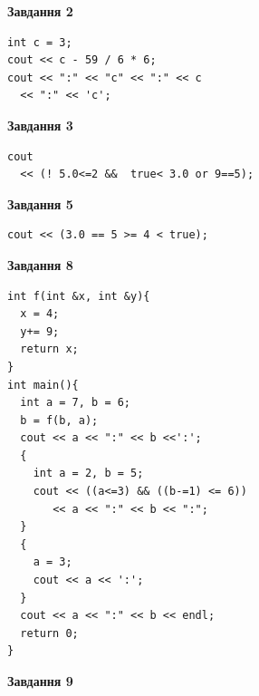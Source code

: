 \documentclass[12pt, ukrainian]{article}
\begin{document}
{\begin {large}
\begin{minipage}[t]{7.0cm}
\end{minipage}
\vline \hspace{1mm}
\begin{minipage}[t]{11.0cm}

\begin{center}
\textbf{Завдання 2}
\end{center}
\vspace{-8mm}

\begin{verbatim}
int c = 3;
cout << c - 59 / 6 * 6;
cout << ":" << "c" << ":" << c 
  << ":" << 'c';
\end{verbatim}



\begin{center}
\textbf{Завдання 3}
\end{center}
\vspace{-8mm}

\begin{verbatim}
cout 
  << (! 5.0<=2 &&  true< 3.0 or 9==5);
\end{verbatim}



\begin{center}
\textbf{Завдання 5}
\end{center}
\vspace{-8mm}

\begin{verbatim}
cout << (3.0 == 5 >= 4 < true);
\end{verbatim}



\begin{center}
\textbf{Завдання 8}
\end{center}
\vspace{-8mm}

\begin{verbatim}
int f(int &x, int &y){
  x = 4;
  y+= 9;
  return x;
}
int main(){
  int a = 7, b = 6;
  b = f(b, a);
  cout << a << ":" << b <<':';
  {
    int a = 2, b = 5;
    cout << ((a<=3) && ((b-=1) <= 6))
       << a << ":" << b << ":";
  }
  {
    a = 3;
    cout << a << ':';
  }
  cout << a << ":" << b << endl;
  return 0;
}
\end{verbatim}

\end{minipage}


\begin{minipage}[t]{7.0cm}

\begin{center}
\textbf{Завдання 9}
\end{center}
\vspace{-8mm}


\end{minipage}
\end{large}}
\end{document}
